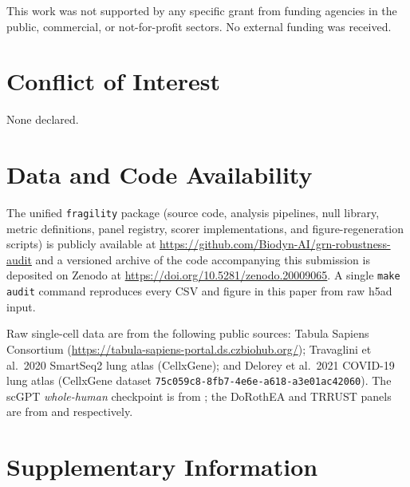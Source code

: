 \documentclass[12pt]{article}
\begin{document}
This work was not supported by any specific grant from funding agencies in the
public, commercial, or not-for-profit sectors. No external funding was received.

\section*{Conflict of Interest}

None declared.

\section*{Data and Code Availability}

The unified \texttt{fragility} package (source code, analysis
pipelines, null library, metric definitions, panel registry, scorer
implementations, and figure-regeneration scripts) is publicly available
at \url{https://github.com/Biodyn-AI/grn-robustness-audit} and a
versioned archive of the code accompanying this submission is deposited
on Zenodo at \url{https://doi.org/10.5281/zenodo.20009065}. A single
\texttt{make audit} command reproduces every CSV and figure in this
paper from raw h5ad input.

Raw single-cell data are from the following public sources: Tabula
Sapiens Consortium (\url{https://tabula-sapiens-portal.ds.czbiohub.org/});
Travaglini et al.\ 2020 SmartSeq2 lung atlas (CellxGene); and
Delorey et al.\ 2021 COVID-19 lung atlas (CellxGene dataset
\texttt{75c059c8-8fb7-4e6e-a618-a3e01ac42060}).
The scGPT \emph{whole-human} checkpoint is from
\citet{Cui2024}; the DoRothEA and TRRUST panels are from
\citet{GarciaAlonso2019} and \citet{Han2018} respectively.

\section*{Supplementary Information}
\end{document}

